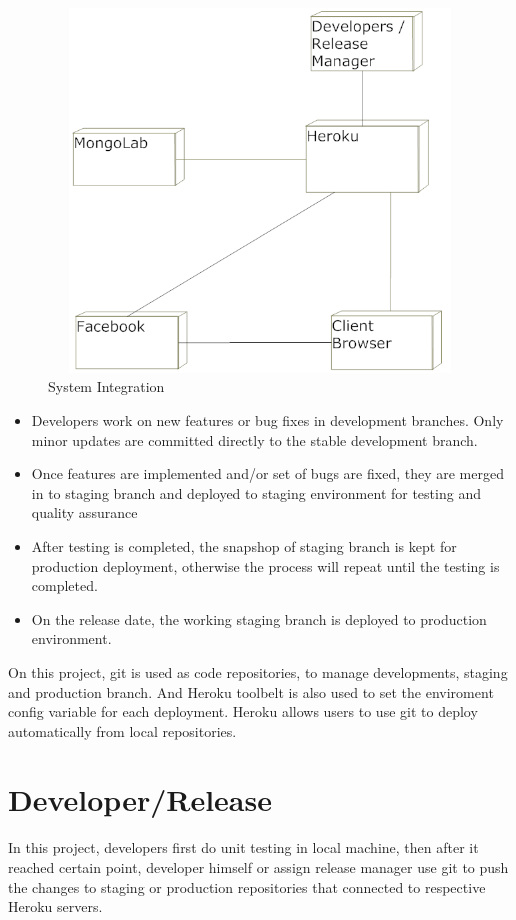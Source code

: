\vspace{3em}
\begin{figure}[H]
\begin{center}
\includegraphics[height=3.8in,width=6.5in]{images/systemIntegration.png}
\caption{System Integration}
\label{fig:system-integration}
\end{center}
\end{figure}

\begin{itemize}
\item Developers work on new features or bug fixes in development branches. Only minor updates are committed directly to the stable development branch.
\item Once features are implemented and/or set of bugs are fixed, they are merged in to staging branch and deployed to staging environment for testing and quality assurance
\item After testing is completed, the snapshop of staging branch is kept for production deployment, otherwise the process will repeat until the testing is completed.
\item On the release date, the working staging branch is deployed to production environment.
\end{itemize}

On this project, git is used as code repositories, to manage developments, staging and production branch. And Heroku toolbelt is also used to set the enviroment config variable for each deployment. Heroku allows users to use git to deploy automatically from local repositories. 
 
\section{Developer/Release}
In this project, developers first do unit testing in local machine, then after it reached certain point, developer himself or assign release manager use git to push the changes to staging or production repositories that connected to respective Heroku servers. 


